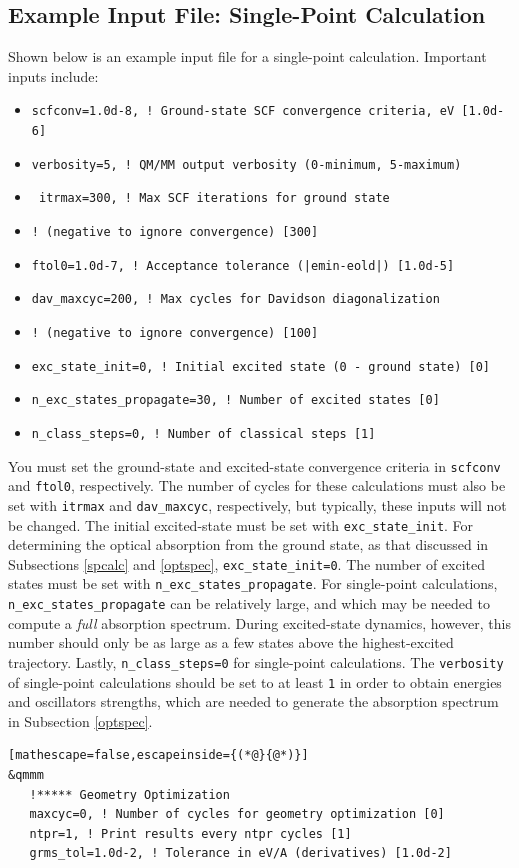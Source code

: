 \documentclass[letterpaper,12pt,titlepage]{article}
\begin{document}
\begin{appendix}
\subsection{Example Input File: Single-Point Calculation}
\label{input_spcalc}
Shown below is an example input file for a single-point calculation.  Important inputs include:
\begin{itemize}
\item \verb+scfconv=1.0d-8, ! Ground-state SCF convergence criteria, eV [1.0d-6]+
\item \verb+verbosity=5, ! QM/MM output verbosity (0-minimum, 5-maximum)+
\item \verb+ itrmax=300, ! Max SCF iterations for ground state+ 
\item[] \verb+! (negative to ignore convergence) [300]+
\item \verb+ftol0=1.0d-7, ! Acceptance tolerance (|emin-eold|) [1.0d-5]+
\item \verb+dav_maxcyc=200, ! Max cycles for Davidson diagonalization+
\item[] \verb+! (negative to ignore convergence) [100]+
\item \verb+exc_state_init=0, ! Initial excited state (0 - ground state) [0]+
\item \verb+n_exc_states_propagate=30, ! Number of excited states [0]+
\item \verb+n_class_steps=0, ! Number of classical steps [1]+
\end{itemize}
You must set the ground-state and excited-state convergence criteria in \verb+scfconv+ and \verb+ftol0+, respectively.  The number of cycles for these calculations must also be set with \verb+itrmax+ and \verb+dav_maxcyc+, respectively, but typically, these inputs will not be changed.  The initial excited-state must be set with \verb+exc_state_init+.  For determining the optical absorption from the ground state, as that discussed in Subsections \ref{spcalc} and \ref{optspec}, \verb+exc_state_init=0+.  The number of excited states must be set with \verb+n_exc_states_propagate+.  For single-point calculations, \verb+n_exc_states_propagate+ can be relatively large, and which may be needed to compute a \textit{full} absorption spectrum.  During excited-state dynamics, however, this number should only be as large as a few states above the highest-excited trajectory.  Lastly, \verb+n_class_steps=0+ for single-point calculations.  The \verb+verbosity+ of single-point calculations should be set to at least \verb+1+ in order to obtain energies and oscillators strengths, which are needed to generate the absorption spectrum in Subsection \ref{optspec}.
\begin{lstlisting}[mathescape=false,escapeinside={(*@}{@*)}]
&qmmm
   !***** Geometry Optimization
   maxcyc=0, ! Number of cycles for geometry optimization [0]
   ntpr=1, ! Print results every ntpr cycles [1]
   grms_tol=1.0d-2, ! Tolerance in eV/A (derivatives) [1.0d-2]


\end{lstlisting}
\end{appendix}
\end{document}
